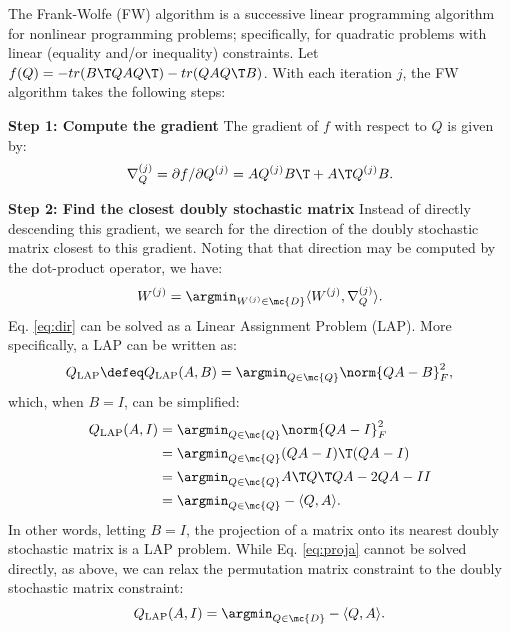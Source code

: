 \documentclass[10pt,journal,cspaper,compsoc]{IEEEtran}
\begin{document}
The Frank-Wolfe (FW) algorithm is a successive linear programming algorithm for nonlinear programming problems; specifically, for quadratic problems with linear (equality and/or inequality) constraints. Let $f(Q)=- tr(B\T QAQ\T) - tr(QAQ\T B)$.  With each iteration $j$, the FW algorithm takes the following steps:

\textbf{Step 1: Compute the gradient} The gradient of $f$ with respect to $Q$ is given by:
\begin{align} \label{eq:grad}
	\nabla_Q^{(j)} = \partial f / \partial Q^{(j)} =  A Q^{(j)} B\T + A\T Q^{(j)} B.
\end{align}


\textbf{Step 2: Find the closest doubly stochastic matrix} Instead of directly descending this gradient, we search for the direction of the doubly stochastic matrix closest to this gradient. Noting that that direction may be computed by the dot-product operator, we have:
\begin{align}\label{eq:dir}
	W^{(j)} = \argmin_{W^{(j)} \in \mc{D}} \langle W^{(j)}, \nabla_Q^{(j)} \rangle. %
\end{align}
Eq. \eqref{eq:dir} can be solved as a Linear Assignment Problem (LAP).  More specifically, a LAP can be written as:
\begin{align} \label{eq:LAP}
	Q_{\text{LAP}} \defeq Q_{\text{LAP}}(A,B) = \argmin_{Q \in \mc{Q}} \norm{QA - B }^2_F,
\end{align}
which, when $B=I$, can be simplified:
\begin{align} \label{eq:proja}
	Q_{\text{LAP}}(A,I) &=\argmin_{Q \in \mc{Q}} \norm{QA - I}_F^2 
	\nonumber \\ &= \argmin_{Q \in \mc{Q}} (QA-I)\T (QA-I) 
	\nonumber\\ &=\argmin_{Q \in \mc{Q}} A\T Q\T QA -2QA - II 
	\nonumber\\ &= \argmin_{Q \in \mc{Q}}  -\langle Q, A \rangle.  
\end{align}
In other words, letting $B=I$, the projection of a matrix onto its nearest doubly stochastic matrix is a LAP problem.  While Eq. \eqref{eq:proja} cannot be solved directly, as above, we can relax the permutation matrix constraint to the doubly stochastic matrix constraint:
\begin{align}\label{eq:relaxed}
	Q_{\text{LAP}}(A,I) = \argmin_{Q\in\mc{D}} -\langle Q, A \rangle. 
\end{align}
\end{document}
